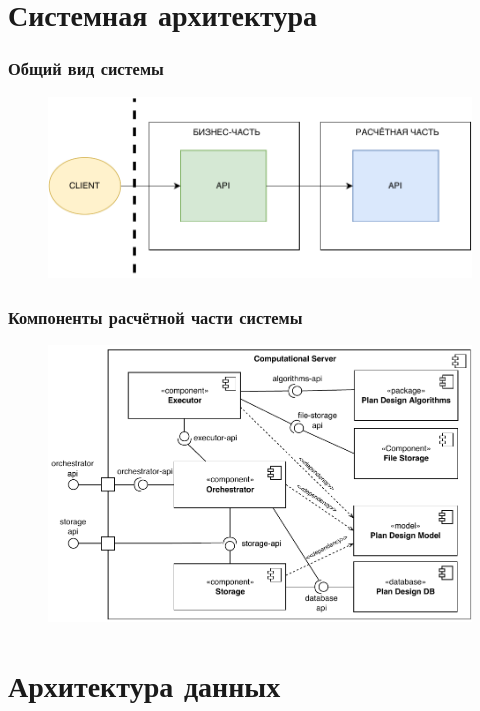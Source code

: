 \section{Системная архитектура}

\begin{frame}
\frametitle{Общий вид системы}
\begin{figure}
    \includegraphics[scale=.9]{pictures/architecture/system}
\end{figure}
\end{frame}

\begin{frame}
\frametitle{Компоненты расчётной части системы}
\begin{figure}
    \includegraphics[scale=.67]{pictures/architecture/component}
\end{figure}
\end{frame}

\section{Архитектура данных}

